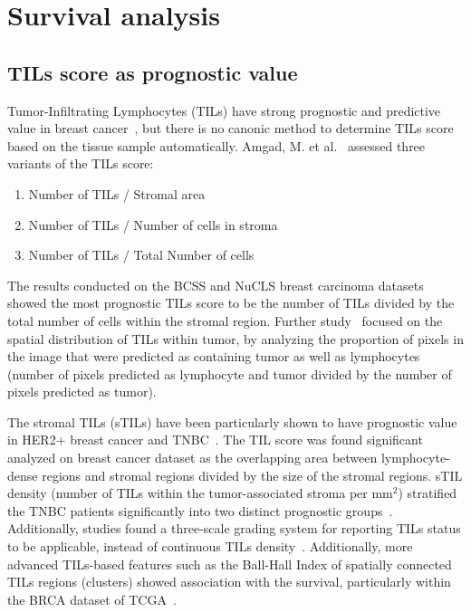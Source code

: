 \section{Survival analysis}
\subsection{TILs score as prognostic value}
Tumor-Infiltrating Lymphocytes (TILs) have strong prognostic and predictive value in breast cancer~\cite{amgad2022mutils}, but there is no canonic method to determine TILs score based on the tissue sample automatically. Amgad, M. et al.~\cite{amgad2022mutils} assessed three variants of the TILs score:
\begin{enumerate}
    \item Number of TILs / Stromal area 
    \item Number of TILs / Number of cells in stroma
    \item Number of TILs / Total Number of cells 
\end{enumerate}
The results conducted on the BCSS and NuCLS breast carcinoma datasets~\cite{amgad2019structured, amgad2021nucls} showed the most prognostic TILs score to be the number of TILs divided by the total number of cells within the stromal region. Further study~\cite{le2020utilizing} focused on the spatial distribution of TILs within tumor, by analyzing the proportion of pixels in the image that were predicted as containing tumor as well as lymphocytes (number of pixels predicted as lymphocyte and tumor divided by the number of pixels predicted as tumor). 

The stromal TILs (sTILs) have been particularly shown to have prognostic value in HER2+ breast cancer and TNBC~\cite{locy2022assessing}. The TIL score was found significant~\cite{sun2021computational} analyzed on breast cancer dataset as the overlapping area between lymphocyte-dense regions and stromal regions divided by the size of the stromal regions. sTIL density (number of TILs within the tumor-associated stroma per mm$^2$) stratified the TNBC patients significantly into two distinct prognostic groups~\cite{thagaard2021automated}.  Additionally, studies found a three-scale grading system for reporting TILs status to be applicable, instead of continuous TILs density~\cite{kotoula2016tumors}. Additionally, more advanced TILs-based features such as the Ball-Hall Index of spatially connected TILs regions (clusters) showed association with the survival, particularly within the BRCA dataset of TCGA~\cite{saltz2018spatial}. 